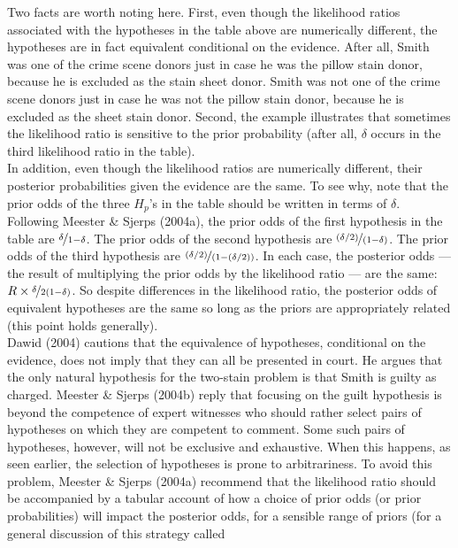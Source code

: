 \documentclass[10pt,dvipsnames,enabledeprecatedfontcommands]{scrartcl}
\begin{document}
\normalsize
\vspace{2mm} \noindent
Two facts are worth noting here. First, even though the likelihood
ratios associated with the hypotheses in the table above are numerically
different, the hypotheses are in fact equivalent conditional on the
evidence. After all, Smith was one of the crime scene donors just in
case he was the pillow stain donor, because he is excluded as the stain
sheet donor. Smith was not one of the crime scene donors just in case he
was not the pillow stain donor, because he is excluded as the sheet
stain donor. Second, the example illustrates that sometimes the
likelihood ratio is sensitive to the prior probability (after all,
\(\delta\) occurs in the third likelihood ratio in the table).\\
In addition, even though the likelihood ratios are numerically
different, their posterior probabilities given the evidence are the
same. To see why, note that the prior odds of the three \(H_p\)'s in the
table should be written in terms of \(\delta\). Following Meester \&
Sjerps (2004a), the prior odds of the first hypothesis in the table are
\(\nicefrac{\delta}{1-\delta}\). The prior odds of the second hypothesis
are \(\nicefrac{(\delta/2)}{(1-\delta)}\). The prior odds of the third
hypothesis are \(\nicefrac{(\delta/2)}{(1-(\delta/2))}\). In each case,
the posterior odds --- the result of multiplying the prior odds by the
likelihood ratio --- are the same:
\(R\times \nicefrac{\delta}{2(1-\delta)}\). So despite differences in
the likelihood ratio, the posterior odds of equivalent hypotheses are
the same so long as the priors are appropriately related (this point
holds generally).\\
Dawid (2004) cautions that the equivalence of hypotheses, conditional on
the evidence, does not imply that they can all be presented in court. He
argues that the only natural hypothesis for the two-stain problem is
that Smith is guilty as charged. Meester \& Sjerps (2004b) reply that
focusing on the guilt hypothesis is beyond the competence of expert
witnesses who should rather select pairs of hypotheses on which they are
competent to comment. Some such pairs of hypotheses, however, will not
be exclusive and exhaustive. When this happens, as seen earlier, the
selection of hypotheses is prone to arbitrariness. To avoid this
problem, Meester \& Sjerps (2004a) recommend that the likelihood ratio
should be accompanied by a tabular account of how a choice of prior odds
(or prior probabilities) will impact the posterior odds, for a sensible
range of priors (for a general discussion of this strategy called
\end{document}
